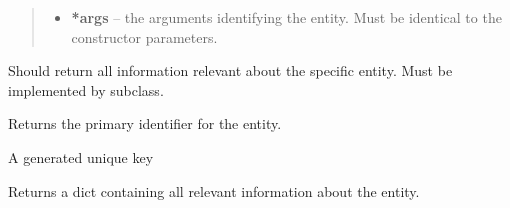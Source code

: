 \documentclass[letterpaper,10pt,english]{sphinxmanual}
\begin{document}
\begin{fulllineitems}
\begin{fulllineitems}
\begin{quote}
\begin{description}
\begin{itemize}
\item {} 
\textbf{*args} -- the arguments identifying the entity. Must be identical to the constructor parameters.

\end{itemize}

\end{description}\end{quote}

\end{fulllineitems}


\begin{fulllineitems}
\label{ambrosia.model:ambrosia.model.Entity.get_serializeable_properties}
Should return all information relevant about the specific entity. Must be implemented by subclass.

\end{fulllineitems}


\begin{fulllineitems}
\label{ambrosia.model:ambrosia.model.Entity.primary_identifier}
Returns the primary identifier for the entity.

\end{fulllineitems}


\begin{fulllineitems}
\label{ambrosia.model:ambrosia.model.Entity.primary_key}
A generated unique key

\end{fulllineitems}


\begin{fulllineitems}
\label{ambrosia.model:ambrosia.model.Entity.to_serializeable}
Returns a dict containing all relevant information about the entity.

\end{fulllineitems}


\end{fulllineitems}
\end{document}

